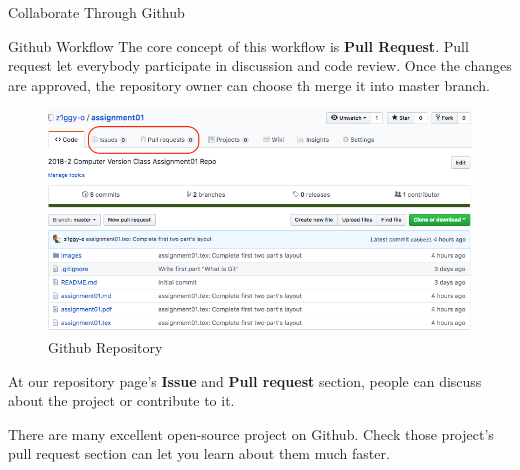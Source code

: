 \documentclass[10pt, a4papaer]{article}
\begin{document}
\begin{section}{Collaborate Through Github}
\begin{subsection}{Github Workflow}
The core concept of this workflow is \textbf{Pull Request}. Pull request let
everybody participate in discussion and code review. Once the changes are approved,
the repository owner can choose th merge it into master branch.

\hypertarget{repo}{
\begin{figure}[ht]
    \centering
    \includegraphics[width=1\textwidth]{images/github-repo}
    \caption{Github Repository}
\end{figure}
}

At our repository page's \textbf{Issue} and \textbf{Pull request} section,
people can discuss about the project or contribute to it.

There are many excellent open-source project on Github. Check those project's
pull request section can let you learn about them much faster.

\end{subsection}

\end{section}
\end{document}
